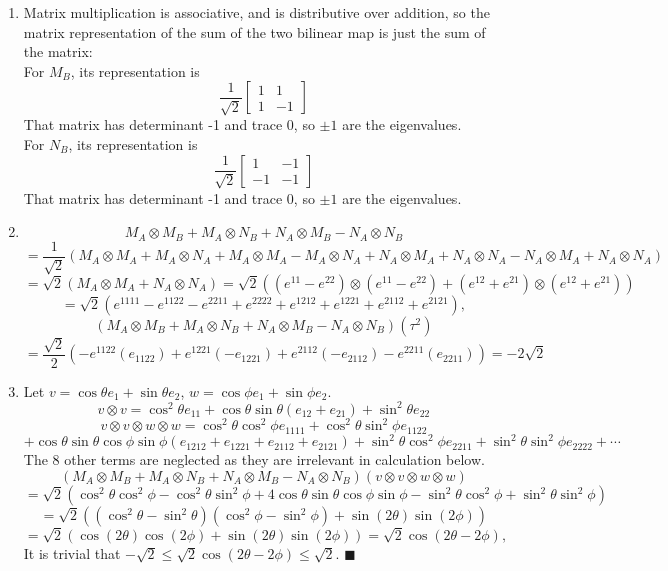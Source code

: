 \documentclass{article}
\begin{document}
\begin{enumerate}
    \item Matrix multiplication is associative, and is distributive over addition, so the matrix representation of the sum of the two bilinear map is just the sum of the matrix: \\
    For $M_B$, its representation is 
    \[\frac{1}{\sqrt{2}} \left[\begin{array}{cc} 1 & 1 \\ 1 & -1 \end{array}\right]\]
    That matrix has determinant -1 and trace 0, so $\pm 1$ are the eigenvalues. \\
    For $N_B$, its representation is 
    \[\frac{1}{\sqrt{2}} \left[\begin{array}{cc} 1 & -1 \\ -1 & -1 \end{array}\right]\]
    That matrix has determinant -1 and trace 0, so $\pm 1$ are the eigenvalues.
    \item 
    \[M_A \otimes M_B + M_A\otimes N_B+N_A\otimes M_B - N_A\otimes N_B \]
    \[=\frac{1}{\sqrt{2}}(
    M_A\otimes M_A + M_A\otimes N_A + M_A\otimes M_A - M_A\otimes N_A + N_A\otimes M_A + N_A\otimes N_A - N_A\otimes M_A + N_A\otimes N_A )\]
    \[=\sqrt{2}(M_A\otimes M_A + N_A \otimes N_A) = \sqrt{2}((e^{11}-e^{22})\otimes(e^{11}-e^{22})+(e^{12}+e^{21})\otimes(e^{12}+e^{21}) )\]
    \[=\sqrt{2}(e^{1111}-e^{1122}-e^{2211}+e^{2222}+e^{1212}+e^{1221}+e^{2112}+e^{2121}),\]
    \[(M_A \otimes M_B + M_A\otimes N_B+N_A\otimes M_B - N_A\otimes N_B)(\tau^2)\]
    \[=\frac{\sqrt{2}}{2}(-e^{1122}(e_{1122})+e^{1221}(-e_{1221})+e^{2112}(-e_{2112})-e^{2211}(e_{2211})) = -2\sqrt{2}\]
    \item 
    Let $v = \cos \theta e_1 + \sin \theta e_2$, $w = \cos\phi e_1 + \sin\phi e_2$.
    \[v\otimes v = \cos^2\theta e_{11} + \cos\theta \sin\theta (e_{12}+e_{21}) + \sin^2 \theta e_{22}\]
    \[v\otimes v \otimes w \otimes w = \cos^2\theta \cos^2 \phi e_{1111} + \cos^2\theta \sin^2 \phi e_{1122} \]
    \[+ \cos\theta \sin\theta \cos \phi\sin\phi (e_{1212}+e_{1221}+e_{2112}+e_{2121}) + \sin^2\theta \cos^2 \phi e_{2211} + \sin^2 \theta \sin^2 \phi e_{2222} +\cdots\]
    The 8 other terms are neglected as they are irrelevant in calculation below.
    \[(M_A \otimes M_B + M_A\otimes N_B+N_A\otimes M_B - N_A\otimes N_B)(v\otimes v \otimes w \otimes w)\]
    \[=\sqrt{2}(\cos^2\theta \cos^2 \phi-\cos^2\theta \sin^2 \phi + 4\cos\theta \sin\theta \cos \phi\sin\phi -\sin^2\theta \cos^2 \phi + \sin^2 \theta \sin^2 \phi)\]
    \[=\sqrt{2}((\cos^2\theta-\sin^2\theta)(\cos^2\phi-\sin^2\phi)+ \sin(2\theta)\sin(2\phi))\]
    \[=\sqrt{2}(\cos(2\theta)\cos(2\phi)+\sin(2\theta)\sin(2\phi)) = \sqrt{2}\cos(2\theta - 2\phi),\]
    It is trivial that $-\sqrt{2}\leq \sqrt{2}\cos(2\theta - 2\phi) \leq \sqrt{2}.$  $\blacksquare$
\end{enumerate}
\end{document}
